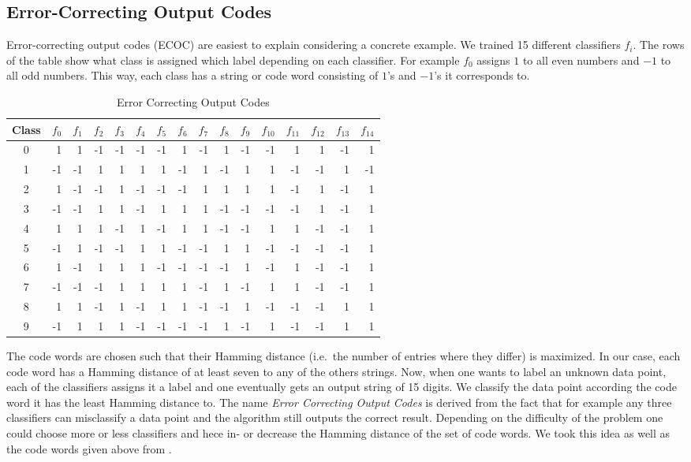 \subsection{Error-Correcting Output Codes}
Error-correcting output codes (ECOC) are easiest to explain considering a concrete example. We trained 15 different classifiers $f_i$. The rows of the table show what class is assigned which label depending on each classifier. For example $f_0$ assigns $1$ to all even numbers and $-1$ to all odd numbers. This way, each class has a string or code word consisting of $1$'s and $-1$'s it corresponds to.

\begin{table}[ht!]
	\centering
	\caption{Error Correcting Output Codes}
	\label{Codewords}
	\begin{tabular}{|c|r|r|r|r|r|r|r|r|r|r|r|r|r|r|r|}
		\hline
		Class	& $f_0$ & $f_1$ & $f_2$ & $f_3$ & $f_4$ & $f_5$ & $f_6$ & $f_7$ & $f_8$ & $f_9$ & $f_{10}$ & $f_{11}$ & $f_{12}$ & $f_{13}$ & $f_{14}$ \\ \hline \hline
		0	& 1 & 1 & -1 & -1 & -1 & -1 & 1 & -1 & 1 & -1 & -1 & 1 & 1 & -1 & 1 \\ \hline
		1	& -1 & -1 & 1 & 1 & 1 & 1 & -1 & 1 & -1 & 1 & 1 & -1 & -1 & 1 & -1 \\ \hline
		2	& 1 & -1 & -1 & 1 & -1 & -1 & -1 & 1 & 1 & 1 & 1 & -1 & 1 & -1 & 1 \\ \hline
		3	& -1 & -1 & 1 & 1 & -1 & 1 & 1 & 1 & -1 & -1 & -1 & -1 & 1 & -1 & 1 \\ \hline
		4	& 1 & 1 & 1 & -1 & 1 & -1 & 1 & 1 & -1 & -1 & 1 & 1 & -1 & -1 & 1 \\ \hline
		5	& -1 & 1 & -1 & -1 & 1 & 1 & -1 & -1 & 1 & 1 & -1 & -1 & -1 & -1 & 1 \\ \hline
		6	& 1 & -1 & 1 & 1 & 1 & -1 & -1 & -1 & -1 & 1 & -1 & 1 & -1 & -1 & 1 \\ \hline
		7	& -1 & -1 & -1 & 1 & 1 & 1 & 1 & -1 & 1 & -1 & 1 & 1 & -1 & -1 & 1 \\ \hline
		8	& 1 & 1 & -1 & 1 & -1 & 1 & 1 & -1 & -1 & 1 & -1 & -1 & -1 & 1 & 1 \\ \hline
		9	& -1 & 1 & 1 & 1 & -1 & -1 & -1 & -1 & 1 & -1 & 1 & -1 & -1 & 1 & 1 \\ \hline
	\end{tabular}
\end{table}  

The code words are chosen such that their Hamming distance (i.e.\ the number of entries where they differ) is maximized. In our case, each code word has a Hamming distance of at least seven to any of the others strings. Now, when one wants to label an unknown data point, each of the classifiers assigns it a label and one eventually gets an output string of 15 digits. We classify the data point according the code word it has the least Hamming distance to. The name \textit{Error Correcting Output Codes} is derived from the fact that for example any three classifiers can misclassify a data point and the algorithm still outputs the correct result. Depending on the difficulty of the problem one could choose more or less classifiers and hece in- or decrease the Hamming distance of the set of code words. We took this idea as well as the code words given above from \cite{dietterich1995solving}.


